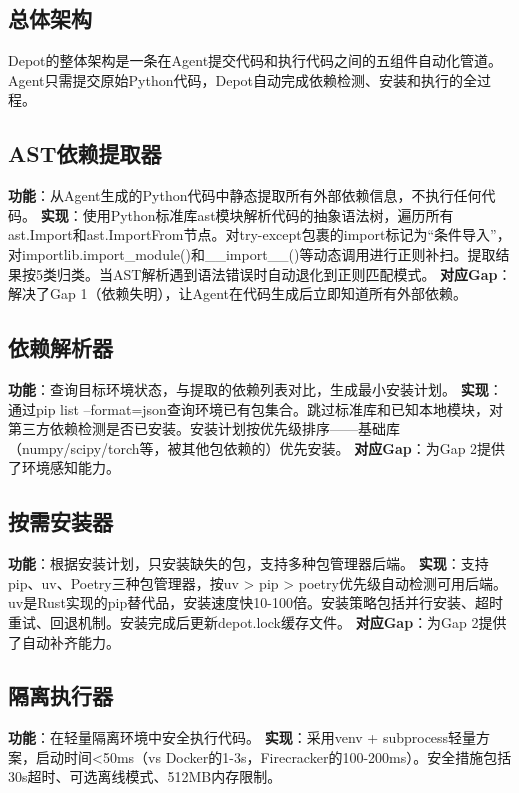\documentclass[10pt]{ctexart}
\begin{document}
\subsection{总体架构}
Depot的整体架构是一条在Agent提交代码和执行代码之间的五组件自动化管道。Agent只需提交原始Python代码，Depot自动完成依赖检测、安装和执行的全过程。

\subsection{AST依赖提取器}
\textbf{功能}：从Agent生成的Python代码中静态提取所有外部依赖信息，不执行任何代码。
\textbf{实现}：使用Python标准库ast模块\cite{pythonast2024}解析代码的抽象语法树，遍历所有ast.Import和ast.ImportFrom节点。对try-except包裹的import标记为“条件导入”，对importlib.import\_module()和\_\_import\_\_()等动态调用进行正则补扫。提取结果按5类归类。当AST解析遇到语法错误时自动退化到正则匹配模式。
\textbf{对应Gap}：解决了Gap 1（依赖失明），让Agent在代码生成后立即知道所有外部依赖。

\subsection{依赖解析器}
\textbf{功能}：查询目标环境状态，与提取的依赖列表对比，生成最小安装计划。
\textbf{实现}：通过pip list --format=json\cite{pip2024}查询环境已有包集合。跳过标准库和已知本地模块，对第三方依赖检测是否已安装。安装计划按优先级排序——基础库（numpy/scipy/torch等，被其他包依赖的）优先安装。
\textbf{对应Gap}：为Gap 2提供了环境感知能力。

\subsection{按需安装器}
\textbf{功能}：根据安装计划，只安装缺失的包，支持多种包管理器后端。
\textbf{实现}：支持pip、uv\cite{uv2024}、Poetry\cite{poetry2024}三种包管理器，按uv > pip > poetry优先级自动检测可用后端。uv是Rust实现的pip替代品，安装速度快10-100倍\cite{uv2024}。安装策略包括并行安装、超时重试、回退机制。安装完成后更新depot.lock缓存文件。
\textbf{对应Gap}：为Gap 2提供了自动补齐能力。

\subsection{隔离执行器}
\textbf{功能}：在轻量隔离环境中安全执行代码。
\textbf{实现}：采用venv + subprocess轻量方案\cite{venv2023,subprocess2024}，启动时间<50ms（vs Docker的1-3s，Firecracker的100-200ms\cite{agache2020firecracker}）。安全措施包括30s超时、可选离线模式、512MB内存限制。
\end{document}
